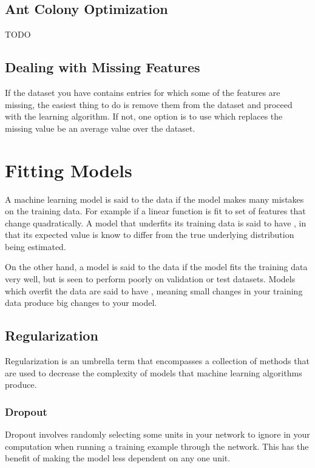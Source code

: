\subsection{Ant Colony Optimization}
TODO

\subsection{Dealing with Missing Features}
If the dataset you have contains entries for which some of the features are missing, the easiest thing to do is remove them from the dataset and proceed with the learning algorithm. If not, one option is to use  which replaces the missing value be an average value over the dataset.

\section{Fitting Models}

A machine learning model is said to  the data if the model makes many mistakes on the training data. For example if a linear function is fit to set of features that change quadratically. A model that underfits its training data is said to have , in that its expected value is know to differ from the true underlying distribution being estimated.

On the other hand, a model is said to  the data if the model fits the training data very well, but is seen to perform poorly on validation or test datasets. Models which overfit the data are said to have , meaning small changes in your training data produce big changes to your model.

\subsection{Regularization}
Regularization is an umbrella term that encompasses a collection of methods that are used to decrease the complexity of models that machine learning algorithms produce.

\subsubsection{Dropout}
Dropout involves randomly selecting some units in your network to ignore in your computation when running a training example through the network. This has the benefit of making the model less dependent on any one unit.

